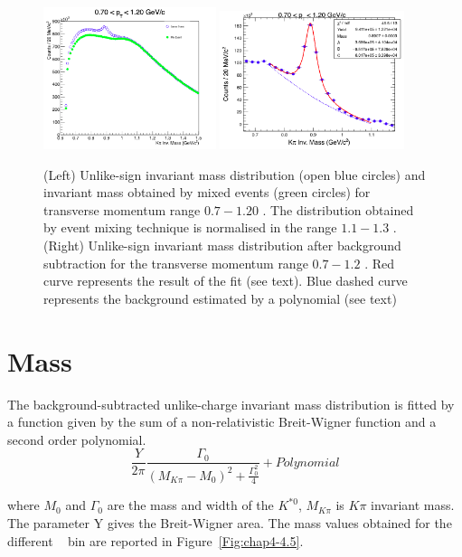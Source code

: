 \begin{figure}[ht]
\includegraphics[width=0.45\textwidth]{Images/Chapter4/1mix.png}
\includegraphics[width=0.48\textwidth]{Images/Chapter4/2sig.png}
\caption{(Left) Unlike-sign invariant mass distribution (open blue circles) and invariant mass obtained by mixed events (green circles) for transverse momentum range $0.7-1.20$ \GeVc. The distribution obtained by event mixing technique is normalised in the range $1.1- 1.3$ \GeVcSq. (Right) Unlike-sign invariant mass distribution after background subtraction for the transverse momentum range $0.7-1.2$ \GeVc. Red curve represents the result of the fit (see text). Blue dashed curve represents the background estimated by a polynomial (see text)}
\label{Fig:chap4-4.4}
\end{figure}




\section{Mass}
\label{par:4.4}
The background-subtracted unlike-charge invariant mass distribution is fitted by a function given by the sum of a non-relativistic Breit-Wigner function and a second order polynomial.
$$\frac{Y}{2\pi}\frac{\Gamma_{0}}{(M_{K\pi} - M_{0})^{2}+  \frac{\Gamma_{0}^{2}}{4}} + Polynomial$$

where $M_{0}$ and $\Gamma_{0}$ are the mass and width of the $K^{*0}$, $M_{K\pi}$ is $K\pi$ invariant mass. The parameter Y gives the Breit-Wigner area. The mass values  obtained for the different \pT~ bin are reported in \mbox{Figure \ref{Fig:chap4-4.5}}. \\
	

